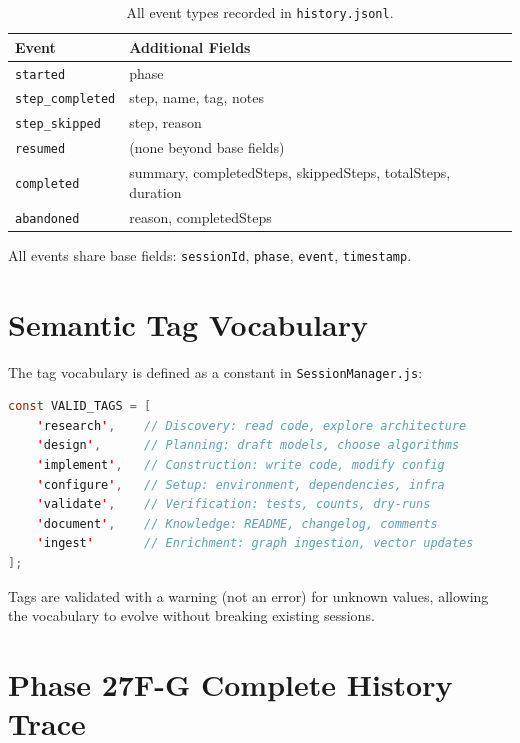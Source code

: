 \documentclass[11pt,letterpaper]{article}
\begin{document}
\begin{table}[h]
\centering
\caption{All event types recorded in \texttt{history.jsonl}.}
\label{tab:events}
\begin{tabular}{@{}lp{7cm}@{}}
\toprule
\textbf{Event} & \textbf{Additional Fields} \\
\midrule
\texttt{started}         & phase \\
\texttt{step\_completed}  & step, name, tag, notes \\
\texttt{step\_skipped}    & step, reason \\
\texttt{resumed}          & (none beyond base fields) \\
\texttt{completed}        & summary, completedSteps, skippedSteps,
                            totalSteps, duration \\
\texttt{abandoned}        & reason, completedSteps \\
\bottomrule
\end{tabular}
\end{table}

All events share base fields: \texttt{sessionId}, \texttt{phase},
\texttt{event}, \texttt{timestamp}.

\section{Semantic Tag Vocabulary}
\label{app:tags}

The tag vocabulary is defined as a constant in \texttt{SessionManager.js}:

\begin{lstlisting}[language=Java]
const VALID_TAGS = [
    'research',    // Discovery: read code, explore architecture
    'design',      // Planning: draft models, choose algorithms
    'implement',   // Construction: write code, modify config
    'configure',   // Setup: environment, dependencies, infra
    'validate',    // Verification: tests, counts, dry-runs
    'document',    // Knowledge: README, changelog, comments
    'ingest'       // Enrichment: graph ingestion, vector updates
];
\end{lstlisting}

Tags are validated with a warning (not an error) for unknown values,
allowing the vocabulary to evolve without breaking existing sessions.

\section{Phase 27F-G Complete History Trace}
\label{app:trace}
\end{document}

